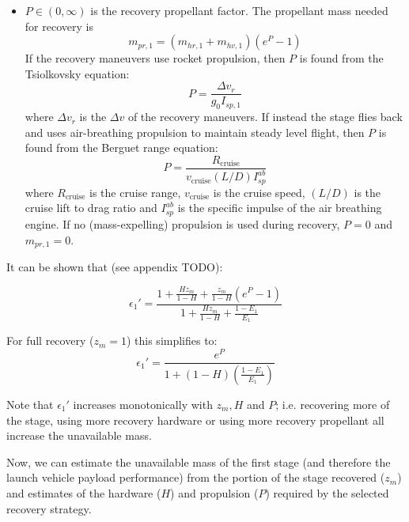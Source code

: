 \documentclass[conf]{new-aiaa}
\begin{document}
\begin{multicols}{2}
\begin{itemize}
    \item $P \in (0, \infty)$  is the recovery propellant factor. The propellant mass needed for recovery is
    \begin{equation}
    m_{pr,1} = (m_{hr,1} + m_{hv,1}) \left( e^P - 1 \right)
    \end{equation}
    If the recovery maneuvers use rocket propulsion, then $P$ is found from the Tsiolkovsky equation:
    \begin{equation}
    \label{eq:rocket_p}
    P = \frac{\Delta v_r}{g_0 I_{sp,1}}
    \end{equation}
    where $\Delta v_r$ is the $\Delta v$ of the recovery maneuvers. If instead the stage flies back and uses air-breathing propulsion to maintain steady level flight, then $P$ is found from the Berguet range equation:
    \begin{equation}
    \label{eq:berguet_p}
    P =  \frac{R_{\mathrm{cruise}}}{v_{\mathrm{cruise}} (L/D) I_{sp}^{ab}}
    \end{equation}
    where $R_{\mathrm{cruise}}$ is the cruise range, $v_{\mathrm{cruise}}$ is the cruise speed, $(L/D)$ is the cruise lift to drag ratio and $I_{sp}^{ab}$ is the specific impulse of the air breathing engine. If no (mass-expelling) propulsion is used during recovery, $P = 0$ and $m_{pr,1} = 0$.
\end{itemize}

It can be shown that (see appendix TODO):

\begin{equation}
\label{eq:eps_h_p_z}
\epsilon_1' = \frac{1 + \frac{H z_m}{1 - H} +  \frac{z_m}{1 - H} (e^P - 1) }{1 + \frac{H z_m}{1 - H} + \frac{1 - E_1}{E_1} }
\end{equation}

For full recovery ($z_m = 1$) this simplifies to:
\begin{equation}
\epsilon_1' = \frac{e^P}{1 + (1 - H) \left( \frac{1 - E_1}{E_1} \right)}
\end{equation}

Note that $\epsilon_1'$ increases monotonically with $z_m, H$ and $P$; i.e. recovering more of the stage, using more recovery hardware or using more recovery propellant all increase the unavailable mass.

Now, we can estimate the unavailable mass of the first stage (and therefore the launch vehicle payload performance) from the portion of the stage recovered ($z_m$) and estimates of the hardware ($H$) and propulsion ($P$) required by the selected recovery strategy. 


\end{multicols}
\end{document}
